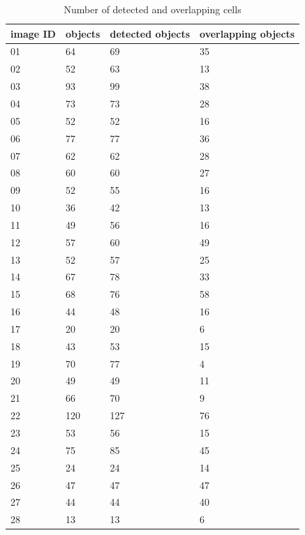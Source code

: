 \begin{table}
	\begin{center}

	\caption{Number of detected and overlapping cells}
	\label{tab:Object}
	\begin{tabular}{|p{2cm}|p{2cm}|p{2cm}|p{2cm}|}
	\textbf{image ID} & objects & detected objects & overlapping objects \\
	\hline 
	\hline 
	01 & 64 & 69 & 35 \\
	02 & 52 & 63 & 13 \\
	03 & 93 & 99 & 38 \\
	04 & 73 & 73 & 28 \\
	05 & 52 & 52 & 16 \\
	06 & 77 & 77 & 36 \\
	07 & 62 & 62 & 28 \\
	08 & 60 & 60 & 27 \\
	09 & 52 & 55 & 16 \\
	10 & 36 & 42 & 13 \\
	11 & 49 & 56 & 16 \\
	12 & 57 & 60 & 49 \\
	13 & 52 & 57 & 25 \\
	14 & 67 & 78 & 33 \\
	15 & 68 & 76 & 58 \\
	16 & 44 & 48 & 16 \\
	17 & 20 & 20 & 6 \\
	18 & 43 & 53 & 15 \\
	19 & 70 & 77 & 4 \\
	20 & 49 & 49 & 11 \\
	21 & 66 & 70 & 9 \\
	22 & 120 & 127 & 76 \\
	23 & 53 & 56 & 15 \\
	24 & 75 & 85 & 45 \\
	25 & 24 & 24 & 14 \\
	26 & 47 & 47 & 47 \\
	27 & 44 & 44 & 40 \\
	28 & 13 & 13 & 6 \\
	\hline
	\end{tabular}
	\end{center}
\end{table}



